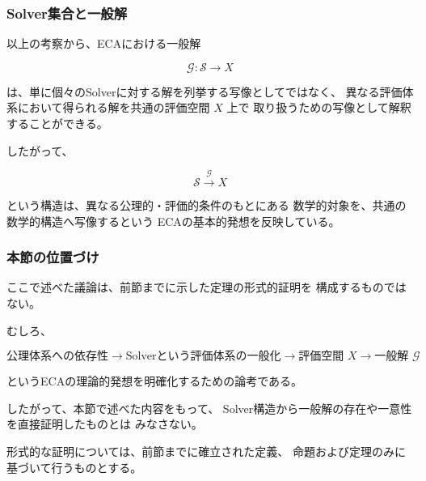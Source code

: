 \subsubsection{Solver集合と一般解}

以上の考察から、ECAにおける一般解

\[
\mathcal{G}:\mathcal{S}\longrightarrow X
\]

は、単に個々のSolverに対する解を列挙する写像としてではなく、
異なる評価体系において得られる解を共通の評価空間 $X$ 上で
取り扱うための写像として解釈することができる。

したがって、

\[
\mathcal{S}
\overset{\mathcal{G}}{\longrightarrow}
X
\]

という構造は、異なる公理的・評価的条件のもとにある
数学的対象を、共通の数学的構造へ写像するという
ECAの基本的発想を反映している。

\subsubsection{本節の位置づけ}

ここで述べた議論は、前節までに示した定理の形式的証明を
構成するものではない。

むしろ、

\[
\text{公理体系への依存性}
\longrightarrow
\text{Solverという評価体系の一般化}
\longrightarrow
\text{評価空間 $X$}
\longrightarrow
\text{一般解 $\mathcal{G}$}
\]

というECAの理論的発想を明確化するための論考である。

したがって、本節で述べた内容をもって、
Solver構造から一般解の存在や一意性を直接証明したものとは
みなさない。

形式的な証明については、前節までに確立された定義、
命題および定理のみに基づいて行うものとする。
